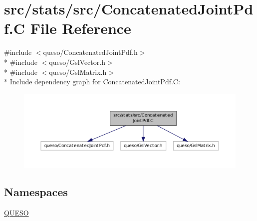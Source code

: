 \hypertarget{_concatenated_joint_pdf_8_c}{\section{src/stats/src/\-Concatenated\-Joint\-Pdf.C File Reference}
\label{_concatenated_joint_pdf_8_c}
}
{\ttfamily \#include $<$queso/\-Concatenated\-Joint\-Pdf.\-h$>$}\\*
{\ttfamily \#include $<$queso/\-Gsl\-Vector.\-h$>$}\\*
{\ttfamily \#include $<$queso/\-Gsl\-Matrix.\-h$>$}\\*
Include dependency graph for Concatenated\-Joint\-Pdf.\-C\-:
\nopagebreak
\begin{figure}[H]
\begin{center}
\leavevmode
\includegraphics[width=350pt]{_concatenated_joint_pdf_8_c__incl}
\end{center}
\end{figure}
\subsection*{Namespaces}
\begin{DoxyCompactItemize}
\item 
\hyperlink{namespace_q_u_e_s_o}{Q\-U\-E\-S\-O}
\end{DoxyCompactItemize}
